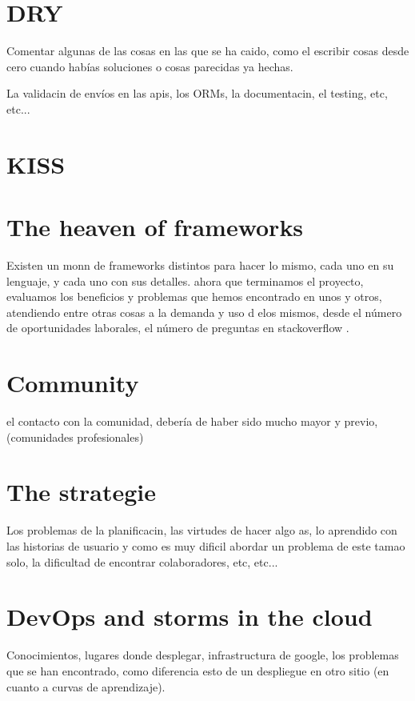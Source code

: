 \documentclass[oneside,english,titlepage]{scrbook}
\begin{document}
\section{DRY}

Comentar algunas de las cosas en las que se ha caido, como el escribir
cosas desde cero cuando habías soluciones o cosas parecidas ya hechas.

La validacin de envíos en las apis, los ORMs, la documentacin, el
testing, etc, etc...

\section{KISS}

\section{The heaven of frameworks}

Existen un monn de frameworks distintos para hacer lo mismo, cada
uno en su lenguaje, y cada uno con sus detalles. ahora que terminamos
el proyecto, evaluamos los beneficios y problemas que hemos encontrado
en unos y otros, atendiendo entre otras cosas a la demanda y uso d
elos mismos, desde el número de oportunidades laborales, el número
de preguntas en stackoverflow .

\section{Community}

el contacto con la comunidad, debería de haber sido mucho mayor y
previo, (comunidades profesionales)

\section{The strategie}

Los problemas de la planificacin, las virtudes de hacer algo as,
lo aprendido con las historias de usuario y como es muy dificil abordar
un problema de este tamao solo, la dificultad de encontrar colaboradores,
etc, etc...

\section{DevOps and storms in the cloud}

Conocimientos, lugares donde desplegar, infrastructura de google,
los problemas que se han encontrado, como diferencia esto de un despliegue
en otro sitio (en cuanto a curvas de aprendizaje).
\end{document}
